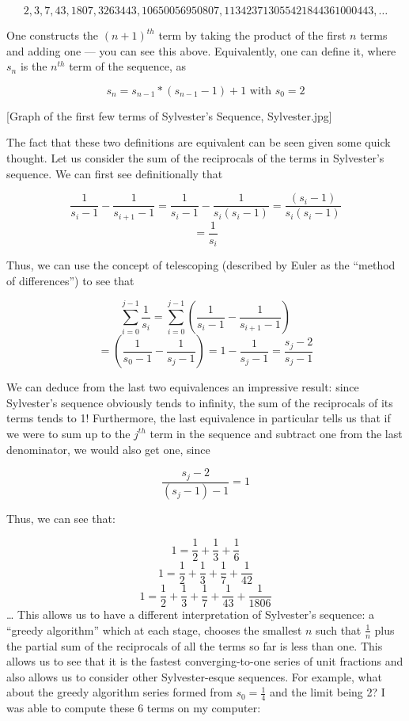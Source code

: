 \documentclass[titlepage,a4paper]{article}
\begin{document}
\[2, 3, 7, 43, 1807, 3263443, 10650056950807, 113423713055421844361000443, \ldots\]

One constructs the \((n+1)^{th}\) term by taking the product of the first \(n\) terms and adding one --- you can see this above. Equivalently, one can define it, where \(s_n\) is the \(n^{th}\) term of the sequence, as\par

\[s_n = s_{n-1}*(s_{n-1}-1)+1 \textrm{ with } s_0 = 2\]

[Graph of the first few terms of Sylvester's Sequence, Sylvester.jpg]

The fact that these two definitions are equivalent can be seen given some quick thought. Let us consider the sum of the reciprocals of the terms in Sylvester’s sequence. We can first see definitionally that\par

\[\frac{1}{s_i-1}-\frac{1}{s_{i+1}-1} = \frac{1}{s_i-1}-\frac{1}{s_i(s_i-1)} = \frac{(s_i-1)}{s_i(s_i-1)}\]
\[ = \frac{1}{s_i}\]

Thus, we can use the concept of telescoping (described by Euler as the “method of differences”) to see that\par

\[\sum^{j-1}_{i=0} \frac{1}{s_i} = \sum^{j-1}_{i=0} (\frac{1}{s_i-1} -\frac{1}{s_{i+1}-1})\]
\[ = (\frac{1}{s_0-1} -\frac{1}{s_{j}-1}) = 1 - \frac{1}{s_{j}-1} = \frac{s_j-2}{s_{j}-1} \]

We can deduce from the last two equivalences an impressive result: since Sylvester’s sequence obviously tends to infinity, the sum of the reciprocals of its terms tends to 1! Furthermore, the last equivalence in particular tells us that if we were to sum up to the \(j^{th}\) term in the sequence and subtract one from the last denominator, we would also get one, since\par
\[ \frac{s_j-2}{(s_{j}-1)-1} = 1\]

Thus, we can see that:\par

\[ 1 = \frac{1}{2}+\frac{1}{3}+\frac{1}{6}\]
\[ 1 = \frac{1}{2}+\frac{1}{3}+\frac{1}{7}+\frac{1}{42}\]
\[ 1 = \frac{1}{2}+\frac{1}{3}+\frac{1}{7}+\frac{1}{43}+\frac{1}{1806}\]
…
This allows us to have a different interpretation of Sylvester’s sequence: a “greedy algorithm” which at each stage, chooses the smallest \(n\) such that \(\frac{1}{n}\) plus the partial sum of the reciprocals of all the terms so far is less than one. This allows us to see that it is the fastest converging-to-one series of unit fractions and also allows us to consider other Sylvester-esque sequences. For example, what about the greedy algorithm series formed from \(s_0 = \frac{1}{4}\) and the limit being 2? I was able to compute these 6 terms on my computer:\par
\end{document}
